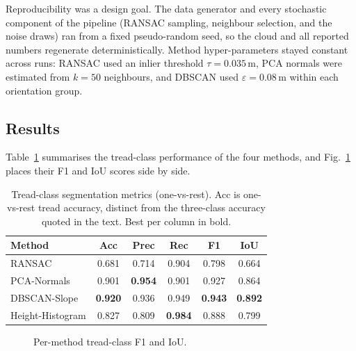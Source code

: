 Reproducibility was a design goal. The data generator and every stochastic
component of the pipeline (RANSAC sampling, neighbour selection, and the
noise draws) ran from a fixed pseudo-random seed, so the cloud and all
reported numbers regenerate deterministically. Method hyper-parameters
stayed constant across runs: RANSAC used an inlier threshold
$\tau=0.035$\,m, PCA normals were estimated from $k=50$ neighbours, and
DBSCAN used $\varepsilon=0.08$\,m within each orientation group.

\subsection{Results}

Table~\ref{tab:metrics} summarises the tread-class performance of the four
methods, and Fig.~\ref{fig:bars} places their F1 and IoU scores side by
side.

\begin{table}[t]
\caption{Tread-class segmentation metrics (one-vs-rest). Acc is one-vs-rest
tread accuracy, distinct from the three-class accuracy quoted in the text.
Best per column in bold.}
\label{tab:metrics}
\centering
\begin{tabular}{lccccc}
\toprule
Method & Acc & Prec & Rec & F1 & IoU \\
\midrule
RANSAC          & 0.681 & 0.714 & 0.904 & 0.798 & 0.664 \\
PCA-Normals     & 0.901 & \textbf{0.954} & 0.901 & 0.927 & 0.864 \\
DBSCAN-Slope    & \textbf{0.920} & 0.936 & 0.949 & \textbf{0.943} & \textbf{0.892} \\
Height-Histogram& 0.827 & 0.809 & \textbf{0.984} & 0.888 & 0.799 \\
\bottomrule
\end{tabular}
\end{table}

\begin{figure}[t]\centering
{}
\caption{Per-method tread-class F1 and IoU.}
\label{fig:bars}
\end{figure}

